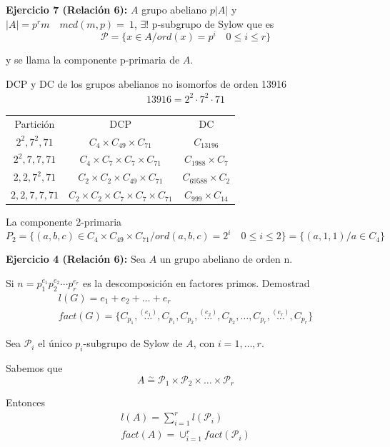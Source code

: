 \documentclass{article}
\begin{document}
\textbf{Ejercicio 7 (Relación 6):} $A$ grupo abeliano $p|A|$ y $|A|=p^rm\quad mcd(m,p)=~1$, $\exists!$ p-subgrupo de Sylow que es
\begin{equation*}
\mathcal{P}=\{x\in A/ord(x)=p^i\quad 0\leq i\leq r\}
\end{equation*}

y se llama la componente p-primaria de $A$.

DCP y DC de los grupos abelianos no isomorfos de orden 13916
\begin{gather*}
13916=2^2\cdot 7^2\cdot 71
\end{gather*}
\begin{tabular}{c|c|c}
Partición & DCP & DC \\
$2^2,7^2,71$&$C_4\times C_{49}\times C_{71}$&$C_{13196}$\\
$2^2,7,7,71$&$C_4\times C_7\times C_7\times C_{71}$&$C_{1988}\times C_7$\\
$2,2,7^2,71$&$C_2\times C_2\times C_{49}\times C_{71}$&$C_{69588}\times C_2$\\
$2,2,7,7,71$&$C_2\times C_2\times C_7\times C_7\times C_{71}$&$C_{999}\times C_{14}$
\end{tabular}

La componente 2-primaria
\begin{equation*}
P_2=\{(a,b,c)\in C_4\times C_{49}\times C_{71}/ord(a,b,c)=2^i\quad 0\leq i\leq 2\}=\{(a,1,1)/a\in C_4\}
\end{equation*}

\textbf{Ejercicio 4 (Relación 6):} Sea $A$ un grupo abeliano de orden n.

Si $n=p_1^{e_1}p_2^{e_2}\cdots p_r^{e_r}$ es la descomposición en factores primos. Demostrad
\begin{gather*}
l(G)=e_1+e_2+\ldots +e_r\\
fact(G)=\{C_{p_1},\overset{(e_1)}{\ldots},C_{p_1},C_{p_2},\overset{(e_2)}{\ldots},C_{p_2},\ldots,C_{p_r},\overset{(e_r)}{\ldots},C_{p_r}\}
\end{gather*}

Sea $\mathcal{P}_i$ el único $p_i$-subgrupo de Sylow de $A$, con $i=1,\ldots,r$.

Sabemos que 
\begin{equation*}
A\overset{\sim}{=}\mathcal{P}_1\times \mathcal{P}_2\times \ldots \times \mathcal{P}_r
\end{equation*}

Entonces 
\begin{gather*}
l(A)=\sum_{i=1}^r l(\mathcal{P}_i) \\
fact(A)=\cup_{i=1}^r fact(\mathcal{P}_i)
\end{gather*}
\end{document}
